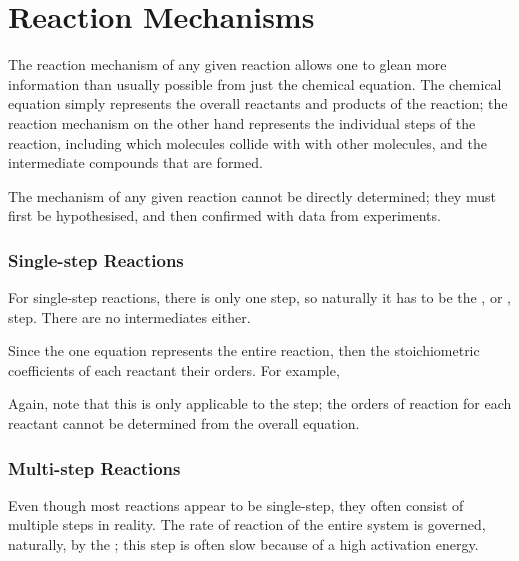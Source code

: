 

\pagebreak
\part{Reaction Mechanisms}

	The reaction mechanism of any given reaction allows one to glean more information than usually possible from just the chemical equation.
	The chemical equation simply represents the overall reactants and products of the reaction; the reaction mechanism on the other hand
	represents the individual steps of the reaction, including which molecules collide with with other molecules, and the intermediate
	compounds that are formed.

	The mechanism of any given reaction cannot be directly determined; they must first be hypothesised, and then confirmed with data from
	experiments.


	\section{Single-step Reactions}

		For single-step reactions, there is only one step, so naturally it has to be the , or , step.
		There are no intermediates either.

		Since the one equation represents the entire reaction, then the stoichiometric coefficients of each reactant  their
		orders. For example,


		Again, note that this is only applicable to the  step; the orders of reaction for each reactant cannot be
		determined from the overall equation.




	\pagebreak
	\section{Multi-step Reactions}

		Even though most reactions appear to be single-step, they often consist of multiple steps in reality. The rate of reaction of the entire
		system is governed, naturally, by the ; this step is often slow because of a high activation energy.

